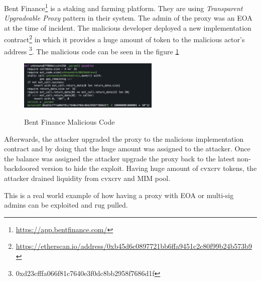 Bent Finance\footnote{\url{https://app.bentfinance.com/}} is a staking and farming platform. They are using \textit{Transparent Upgradeable Proxy} pattern in their system. The admin of the proxy was an EOA at the time of incident. The malicious developer deployed a new implementation contract\footnote{\url{https://etherscan.io/address/0xb45d6c0897721bb6ffa9451c2c80f99b24b573b9}} in which it provides a huge amount of token to the malicious actor's address \footnote{0xd23cfffa066f81c7640e3f0dc8bb2958f7686d1f}. The malicious code can be seen in the figure \ref{bentFi}

\begin{figure}[t]
  \centering
  \includegraphics[width=0.6\textwidth]{figures/bent.png}\label{bentFi}
  \caption{Bent Finance Malicious Code}
\end{figure}

Afterwards, the attacker upgraded the proxy to the malicious implementation contract and by doing that the huge amount was assigned to the attacker. Once the balance was assigned the attacker upgrade the proxy back to the latest non-backdoored version to hide the exploit. 
Having huge amount of cvxcrv tokens, the attacker drained liquidity from cvxcrv and MIM pool\cite{bentFinanceHack}.

This is a real world example of how having a proxy with EOA or multi-sig admins can be exploited and rug pulled.










